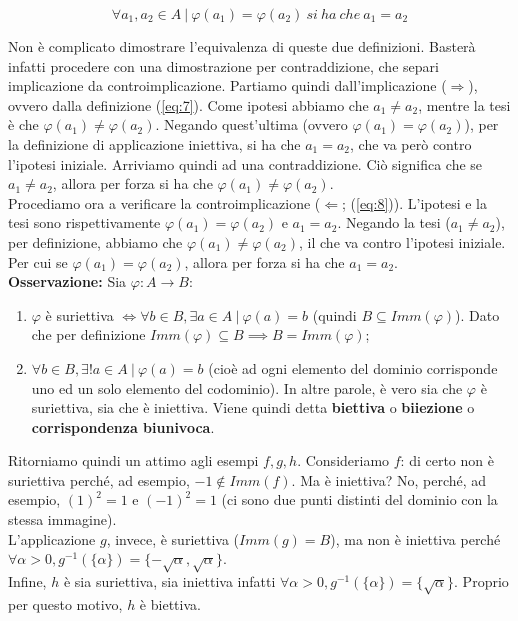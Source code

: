 \documentclass{article}
\begin{document}
\begin{equation}
    \forall a_1, a_2 \in A \ | \ \varphi(a_1) = \varphi(a_2) \ si \ ha \ che \ a_1 = a_2
    \label{eq:8}
\end{equation}

\noindent Non è complicato dimostrare l'equivalenza di queste due definizioni. Basterà infatti procedere con una dimostrazione per contraddizione, che separi implicazione da controimplicazione. Partiamo quindi dall'implicazione ($\Rightarrow$), ovvero dalla definizione (\ref{eq:7}). Come ipotesi abbiamo che $a_1 \neq a_2$, mentre la tesi è che $\varphi(a_1) \neq \varphi(a_2)$. Negando quest'ultima (ovvero $\varphi(a_1) = \varphi(a_2)$), per la definizione di applicazione iniettiva, si ha che $a_1 = a_2$, che va però contro l'ipotesi iniziale. Arriviamo quindi ad una contraddizione. Ciò significa che se $a_1 \neq a_2$, allora per forza si ha che $\varphi(a_1) \neq \varphi(a_2)$. \\
Procediamo ora a verificare la controimplicazione ($\Leftarrow$; (\ref{eq:8})). L'ipotesi e la tesi sono rispettivamente $\varphi(a_1) = \varphi(a_2)$ e $a_1 = a_2$. Negando la tesi ($a_1 \neq a_2$), per definizione, abbiamo che $\varphi(a_1) \neq \varphi(a_2)$, il che va contro l'ipotesi iniziale. Per cui se $\varphi(a_1) = \varphi(a_2)$, allora per forza si ha che $a_1 = a_2$. \\

\noindent\textbf{Osservazione:} Sia $\varphi: A \xrightarrow{} B$:

\begin{enumerate}[label=\roman*)]
    \item $\varphi$ è suriettiva $\iff \forall b \in B, \exists a \in A \ | \ \varphi(a) = b$ (quindi $B \subseteq Imm(\varphi)$). Dato che per definizione $Imm(\varphi) \subseteq B \implies B = Imm(\varphi)$;
    \item $\forall b \in B, \exists !  a \in A \ | \ \varphi(a) = b$ (cioè ad ogni elemento del dominio corrisponde uno ed un solo elemento del codominio). In altre parole, è vero sia che $\varphi$ è suriettiva, sia che è iniettiva. Viene quindi detta \textbf{biettiva} o \textbf{biiezione} o \textbf{corrispondenza biunivoca}.
\end{enumerate}

\noindent Ritorniamo quindi un attimo agli esempi $f, g, h$. Consideriamo $f$: di certo non è suriettiva perché, ad esempio, $-1 \notin Imm(f)$. Ma è iniettiva? No, perché, ad esempio, $(1)^2 = 1$ e $(-1)^2 = 1$ (ci sono due punti distinti del dominio con la stessa immagine). \\
L'applicazione $g$, invece, è suriettiva ($Imm(g) = B$), ma non è iniettiva perché $\forall \alpha > 0, g^{-1}(\{\alpha\}) = \{-\sqrt{\alpha}, \sqrt{\alpha}\}$.\\
Infine, $h$ è sia suriettiva, sia iniettiva infatti $\forall \alpha > 0, g^{-1}(\{\alpha\}) = \{\sqrt{\alpha}\}$. Proprio per questo motivo, $h$ è biettiva.
\end{document}
